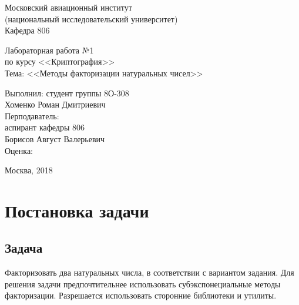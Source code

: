 \documentclass[a4paper,12pt]{article}
\begin{document}
\begin{titlepage}
\begin{center}
    {Московский авиационный институт} \\
    {(национальный исследовательский университет)} \\
    {Кафедра 806}

\vspace{8cm}
\large{
    {Лабораторная работа №1} \\
    {по курсу <<Криптография>>} \\
    {Тема: <<Методы факторизации натуральных чисел>>}
}
\end{center}

\vspace{6cm}
\begin{flushright}
\begin{minipage}{0.4\textwidth}
    \begin{flushleft}
        {Выполнил: студент группы 8О-308} \\
        {Хоменко Роман Дмитриевич} \\
        \vspace{0.5cm}
        {Перподаватель:} \\
        {аспирант кафедры 806} \\
        {Борисов Август Валерьевич} \\
        \vspace{0.5cm}
        Оценка:
    \end{flushleft}
\end{minipage}
\end{flushright}

\vfill
\begin{center}
    {Москва, 2018}
\end{center}

\end{titlepage}

\section{Постановка задачи}

\subsection{Задача}
Факторизовать два натуральных числа, в соответствии с вариантом
задания. Для решения задачи предпочтительнее использовать
субэкспонециальные методы факторизации. Разрешается использовать
сторонние библиотеки и утилиты.
\end{document}
